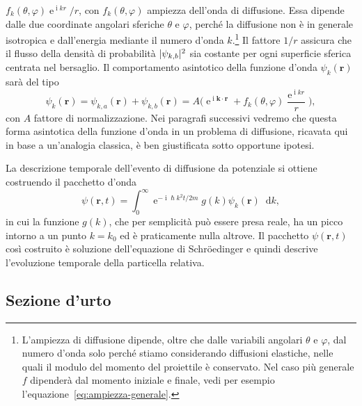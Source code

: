 \documentclass[a4paper,fleqn,twoside,12pt]{article}
\renewcommand{\phi}{\varphi}
\newcommand*{\dd}{\mathop{}\!\mathrm{d}} %
\DeclareMathOperator{\e}{\mathrm{e}} %
\DeclareMathOperator{\uimm}{\mathrm{i}} %
\DeclarePairedDelimiter{\abs}{\lvert}{\rvert}
\begin{document}
$f_{k}(\theta,\phi)\e^{\uimm kr}/r$, con $f_{k}(\theta,\phi)$ ampiezza dell'onda
di diffusione.  Essa dipende dalle due coordinate angolari sferiche $\theta$ e
$\phi$, perché la diffusione non è in generale isotropica e dall'energia
mediante il numero d'onda
$k$.\footnote{L'ampiezza di diffusione dipende, oltre che dalle variabili
  angolari $\theta$ e $\phi$, dal numero d'onda solo perché stiamo considerando
  diffusioni elastiche, nelle quali il modulo del momento del proiettile è
  conservato.  Nel caso più generale $f$ dipenderà dal momento iniziale e
  finale, vedi per esempio l'equazione~\eqref{eq:ampiezza-generale}.}
Il fattore $1/r$ assicura che il flusso della densità di probabilità
$\abs{\psi_{k,b}}^{2}$ sia costante per ogni superficie sferica centrata nel
bersaglio.  Il comportamento asintotico della funzione d'onda $\psi_{k}(\bm{r})$
sarà del tipo
\begin{equation}
  \label{eq:forma-asintotica}
  \psi_{k}(\bm{r}) = \psi_{k,a}(\bm{r}) + \psi_{k,b}(\bm{r}) =A \bigg( \e^{\uimm
    \bm{k}\cdot\bm{r}} + f_{k}(\theta,\phi)\frac{\e^{\uimm kr}}{r} \bigg),
\end{equation}
con $A$ fattore di normalizzazione.  Nei paragrafi successivi vedremo che questa
forma asintotica della funzione d'onda in un problema di diffusione, ricavata
qui in base a un'analogia classica, è ben giustificata sotto opportune ipotesi.

La descrizione temporale dell'evento di diffusione da potenziale si ottiene
costruendo il pacchetto d'onda
\begin{equation}
  \psi(\bm{r},t) = \int_{0}^{\infty} \e^{-\uimm \hslash k^{2} t/2m} g(k)
  \psi_{k}(\bm{r}) \dd k,
\end{equation}
in cui la funzione $g(k)$, che per semplicità può essere presa reale, ha un
picco intorno a un punto $k = k_{0}$ ed è praticamente nulla altrove.  Il
pacchetto $\psi(\bm{r},t)$ così costruito è soluzione dell'equazione di
Schröedinger e quindi descrive l'evoluzione temporale della particella relativa.

\subsection{Sezione d'urto}
\label{sec:sez-urto-mq}
\end{document}
